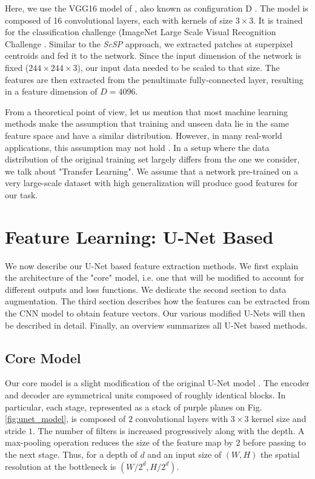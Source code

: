 \endgroup

Here, we use the VGG16 model of \cite{simonyan15}, also known as configuration D \cite[Tab. 1]{simonyan15}.
The model is composed of 16 convolutional layers, each with kernels of size $3 \times 3$.
It is trained for the classification challenge (ImageNet Large Scale Visual Recognition Challenge \cite{ILSVRC15}.
Similar to the \textit{ScSP} approach, we extracted patches at superpixel centroids and fed it to the network.
Since the input dimension of the network is fixed ($244 \times 244 \times 3$), our input data needed to be scaled to that size.
The features are then extracted from the penultimate fully-connected layer, resulting in a feature dimension of $D=4096$.

From a theoretical point of view, let us mention that most machine learning methods make the assumption that training and unseen data lie in the same feature space and have a similar distribution.
However, in many real-world applications, this assumption may not hold \cite{pan2010}.
In a setup where the data distribution of the original training set largely differs from the one we consider, we talk about "Transfer Learning".
We assume that a network pre-trained on a very large-scale dataset with high generalization will produce good features for our task.

\section{Feature Learning: U-Net Based} \label{ch:unet_based}
We now describe our U-Net based feature extraction methods.
We first explain the architecture of the "core" model, i.e. one that will be modified to account for different outputs and loss functions.
We dedicate the second section to data augmentation.
The third section describes how the features can be extracted from the CNN model to obtain feature vectors.
Our various modified U-Nets will then be described in detail.
Finally, an overview summarizes all U-Net based methods.

\subsection{Core Model} \label{model}
Our core model is a slight modification of the original U-Net model \cite{ronneberger15}.
The encoder and decoder are symmetrical units composed of roughly identical blocks.
In particular, each stage, represented as a stack of purple planes on Fig. \ref{fig:unet_model}, is composed of $2$ convolutional layers with $3 \times 3$ kernel size and stride $1$.
The number of filters is increased progressively along with the depth.
A max-pooling operation reduces the size of the feature map by $2$ before passing to the next stage.
Thus, for a depth of $d$ and an input size of $(W, H)$ the spatial resolution at the bottleneck is  $(W /2^d, H/2^{d})$.

